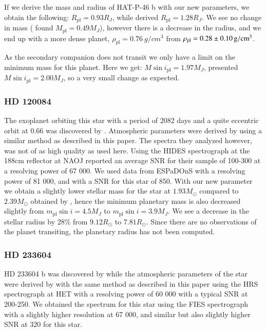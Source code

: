 \documentclass{aa}
\begin{document}
If we derive the mass and radius of HAT-P-46 b with our new parameters, we
obtain the following: $R_\mathrm{pl} = 0.93R_J$, while \citet{Hartmann2014}
derived $R_\mathrm{pl} = 1.28R_J$. We see no change in mass
(\citet{Hartmann2014} found $M_\mathrm{pl}=0.49M_J$), however there is a
decrease in the radius, and we end up with a more dense planet,
$\rho_\mathrm{pl}=\SI{0.76}{g/cm^3}$ from $\rho_\mathrm{pl}=\SI{0.28\pm0.10}{g/cm^3}$.

As the secondary companion does not transit we only have a limit on the minimum
mass for this planet. Here we get: $M\sin i_\mathrm{pl} = 1.97M_J$,
\citet{Hartmann2014} presented $M\sin i_\mathrm{pl} = 2.00M_J$, so a very
small change as expected.


\subsubsection{HD 120084}
\label{sub:HD_120084}
The exoplanet orbiting this star with a period of 2082 days and a quite
eccentric orbit at 0.66 was discovered by \citet{Sato2013}. Atmospheric
parameters were derived by \citet{Takeda2008} using a similar method as
described in this paper. The spectra they analyzed however, was not of as high
quality as used here. Using the HIDES spectrograph at the 188cm reflector at
NAOJ \citet{Takeda2008} reported an average SNR for their sample of 100-300 at a
resolving power of 67 000. We used data from ESPaDOnS with a resolving power of
81 000, and with a SNR for this star of 850. With our new parameter we obtain a
slightly lower stellar mass for the star at $1.93M_\odot$ compared to
$2.39M_\odot$ obtained by \cite{Takeda2008}, hence the minimum planetary mass is
also decreased slightly from $m_\mathrm{pl}\sin i=4.5M_J$ to $m_\mathrm{pl}\sin
i=3.9M_J$. We see a decrease in the stellar radius by 28\% from $9.12R_\odot$ to
$7.81R_\odot$. Since there are no observations of the planet transiting, the
planetary radius has not been computed.


\subsubsection{HD 233604}
\label{sub:HD_233604}
HD 233604 b was discovered by \citet{Nowak2013} while the atmospheric parameters
of the star were derived by \citet{Zielinski2012} with the same method as
described in this paper using the HRS spectrograph at HET with a resolving power
of 60 000 with a typical SNR at 200-250. We obtained the spectrum for this star
using the FIES spectrograph with a slightly higher resolution at 67 000, and
similar but also slightly higher SNR at 320 for this star.
\end{document}
